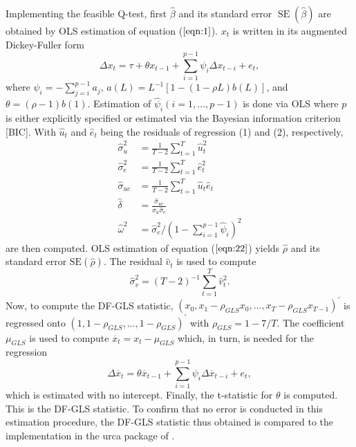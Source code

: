 \documentclass{article}
\begin{document}
Implementing the feasible Q-test, first $\hat{\beta}$ and its standard error $\operatorname{SE}(\widehat{\beta})$ are obtained by OLS estimation of equation ($\ref{eqn:1}$). $x_{t}$ is written in its augmented Dickey-Fuller form
\begin{equation}
\Delta x_{t}=\tau+\theta x_{t-1}+\sum_{i=1}^{p-1} \psi_{i} \Delta x_{t-i}+e_{t},
\end{equation}
where $\psi_{i}=-\sum_{j=i}^{p-1} a_{j}$, $a(L)=L^{-1}[1-(1-\rho L) b(L)]$, and $\theta=(\rho-1) b(1)$. Estimation of $\widehat{\psi}_{i}(i=1, \ldots, p-1)$ is done via OLS where $p$ is either explicitly specified or estimated via the Bayesian information criterion [BIC].
With $\widehat{u}_{t}$ and $\widehat{e}_{t}$ being the residuals of regression (1) and (2), respectively,
\begin{align} \widehat{\sigma}_{u}^{2} &=\frac{1}{T-2} \sum_{t=1}^{T} \widehat{u}_{t}^{2} \\ \widehat{\sigma}_{e}^{2} &=\frac{1}{T-2} \sum_{t=1}^{T} \widehat{e}_{t}^{2} \\ \widehat{\sigma}_{u e} &=\frac{1}{T-2} \sum_{t=1}^{T} \widehat{u}_{t} \widehat{e}_{t} \\ \widehat{\delta} &=\frac{\widehat{\sigma}_{u e}}{\widehat{\sigma}_{u} \widehat{\sigma}_{e}} \\ \widehat{\omega}^{2}&=\widehat{\sigma}_{e}^{2} /\left(1-\sum_{i=1}^{p-1} \widehat{\psi}_{i}\right)^{2}
\end{align}
are then computed. OLS estimation of equation ($\ref{eqn:22}$) yields $\widehat{\rho}$ and its standard error $\mathrm{SE}(\widehat{\rho})$. The residual $\widehat{v}_{t}$ is used to compute 
\begin{equation}
\widehat{\sigma}_{v}^{2}=(T-2)^{-1} \sum_{t=1}^{T} \widehat{v}_{t}^{2}.
\end{equation} 
Now, to compute the DF-GLS statistic, $\left(x_{0}, x_{1}-\rho_{G L S} x_{0}, \ldots, x_{T}-\rho_{G L S} x_{T-1}\right)^{\prime}$ is regressed onto 
$\left(1,1-\rho_{G L S}, \ldots, 1-\rho_{G L S}\right)^{\prime}$ with $\rho_{G L S}=1-7 / T$. The coefficient $\mu_{G L S}$ is used to compute $\overline{x}_{t}=x_{t}-\mu_{G L S}$ which, in turn, is needed for the regression 
\begin{equation}
\Delta \overline{x}_{t}=\theta \overline{x}_{t-1}+\sum_{i=1}^{p-1} \psi_{i} \Delta \overline{x}_{t-i}+e_{t},
\end{equation} which is estimated with no intercept. Finally, the t-statistic for $\theta$ is computed. This is the DF-GLS statistic. To confirm that no error is conducted in this estimation procedure, the DF-GLS statistic thus obtained is compared to the implementation in the urca package of \citet{urca}. 
\end{document}
